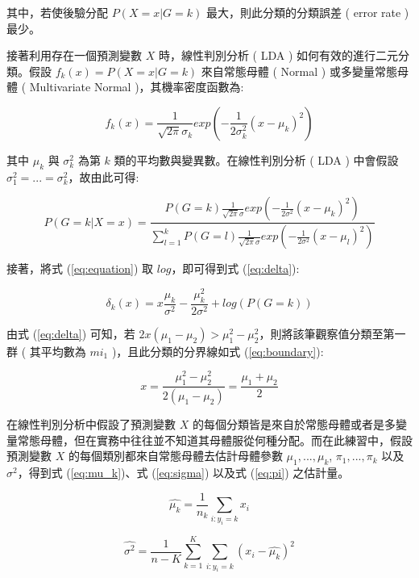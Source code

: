 其中，若使後驗分配 $P(X=x|G=k)$ 最大，則此分類的分類誤差 ( error rate )最少。

接著利用存在一個預測變數 $X$ 時，線性判別分析 ( LDA ) 如何有效的進行二元分類。假設 $f_k(x)=P(X=x|G=k)$ 來自常態母體 ( Normal ) 或多變量常態母體 ( Multivariate Normal )，其機率密度函數為:

\begin{equation}
f_k(x)=\frac{1}{\sqrt{2\pi}\sigma_k}exp(-\frac{1}{2\sigma_k^{2}}(x-\mu_k)^{2})
\end{equation}

其中 $\mu_k$ 與 $\sigma_k^{2}$ 為第 $k$ 類的平均數與變異數。在線性判別分析 ( LDA ) 中會假設 $\sigma_1^{2}=...=\sigma_k^{2}$，故由此可得:

\begin{equation}\label{eq:equation}
P(G=k|X=x)=\frac{P(G=k)\frac{1}{\sqrt{2\pi}\sigma}exp(-\frac{1}{2\sigma^{2}}(x-\mu_k)^{2})}{\sum_{l=1}^{k}P(G=l)\frac{1}{\sqrt{2\pi}\sigma}exp(-\frac{1}{2\sigma^{2}}(x-\mu_l)^{2})}
\end{equation}

接著，將式 (\ref{eq:equation}) 取 $log$，即可得到式 (\ref{eq:delta}):

\begin{equation}\label{eq:delta}
\delta_k(x)=x\frac{\mu_k}{\sigma^{2}}-\frac{\mu_k^{2}}{2\sigma^{2}}+log(P(G=k))
\end{equation}

由式 (\ref{eq:delta}) 可知，若 $2x(\mu_1-\mu_2) > \mu_1^{2}-\mu_2^{2}$，則將該筆觀察值分類至第一群 ( 其平均數為 $mi_1$ )，且此分類的分界線如式 (\ref{eq:boundary}):

\begin{equation}\label{eq:boundary}
x=\frac{\mu_1^{2}-\mu_2^{2}}{2(\mu_1-\mu_2)}=\frac{\mu_1+\mu_2}{2}
\end{equation}

在線性判別分析中假設了預測變數 $X$ 的每個分類皆是來自於常態母體或者是多變量常態母體，但在實務中往往並不知道其母體服從何種分配。而在此練習中，假設預測變數 $X$ 的每個類別都來自常態母體去估計母體參數 $\mu_1,...,\mu_k$, $\pi_1,...,\pi_k$ 以及 $\sigma^{2}$，得到式 (\ref{eq:mu_k})、式 (\ref{eq:sigma}) 以及式 (\ref{eq:pi}) 之估計量。

\begin{equation}\label{eq:mu_k}
\hat{\mu_k}=\frac{1}{n_k}\sum_{i:y_i=k}x_i
\end{equation}

\begin{equation}\label{eq:sigma}
\hat{\sigma^{2}}=\frac{1}{n-K}\sum_{k=1}^{K}\sum_{i:y_i=k}(x_i-\hat{\mu_k})^{2}
\end{equation}

